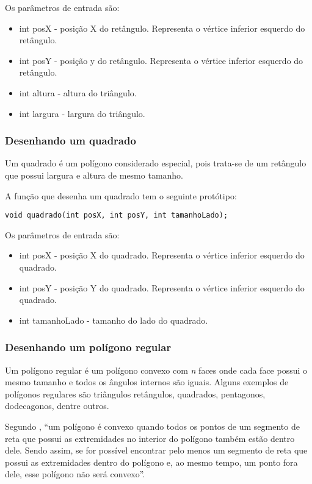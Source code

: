 \documentclass[12pt, %
openright,
oneside, %
a4paper,    %
brazil]{facom-ufu-abntex2}
\begin{document}
Os parâmetros de entrada são:

\begin{itemize}
    \item int posX - posição X do retângulo. Representa o vértice inferior esquerdo do retângulo.
    \item int posY - posição y do retângulo. Representa o vértice inferior esquerdo do retângulo.
    \item int altura - altura do triângulo.
    \item int largura - largura do triângulo.
\end{itemize}

\subsubsection{Desenhando um quadrado}
Um quadrado é um polígono considerado especial, pois trata-se de um retângulo que possui largura e altura de mesmo tamanho.

A função que desenha um quadrado tem o seguinte protótipo:

\begin{verbatim}
void quadrado(int posX, int posY, int tamanhoLado);
\end{verbatim}

Os parâmetros de entrada são:

\begin{itemize}
    \item int posX - posição X do quadrado. Representa o vértice inferior esquerdo do quadrado.
    \item int posY - posição Y do quadrado. Representa o vértice inferior esquerdo do quadrado.
    \item int tamanhoLado - tamanho do lado do quadrado.
\end{itemize}

\subsubsection{Desenhando um polígono regular}
Um polígono regular é um polígono convexo com \textit{n} faces onde cada face possui o mesmo tamanho e todos os ângulos internos são iguais. Alguns exemplos de polígonos regulares são triângulos retângulos, quadrados, pentagonos, dodecagonos, dentre outros.

Segundo , ``um polígono é convexo quando todos os pontos de um segmento de reta que possui as extremidades no interior do polígono também estão dentro dele. Sendo assim, se for possível encontrar pelo menos um segmento de reta que possui as extremidades dentro do polígono e, ao mesmo tempo, um ponto fora dele, esse polígono não será convexo''.
\end{document}
